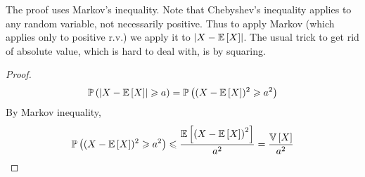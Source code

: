 The proof uses Markov's inequality. Note that Chebyshev's inequality applies to any random variable,
not necessarily positive. Thus to apply Markov (which applies only to positive r.v.) we 
apply it to $\abs{X-\expectation{X}}$. The usual trick to get rid of absolute value, which is hard to deal with, is by squaring.


\begin{proof}
    \[\prob{\abs{X-\expectation{X}} \geq a} = \prob{(X-\expectation{X})^2 \geq a^2}\]
    By Markov inequality,
    \[ \prob{(X-\expectation{X})^2 \geq a^2} \leq \frac{\expectation{\left(X-\expectation{X}\right)^2}}{a^2}=\frac{\variance{X}}{a^2}\]
\end{proof}

